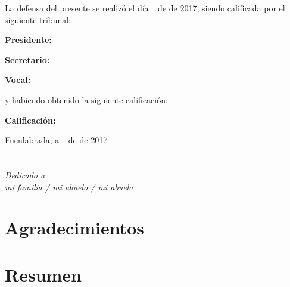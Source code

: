 \vspace{1cm}
La defensa del presente \TFM se realizó el día \qquad$\;\,$ de \qquad\qquad\qquad\qquad \newline de 2017, siendo calificada por el siguiente tribunal:


\vspace{0.5cm}
\textbf{Presidente:}

\vspace{1.2cm}
\textbf{Secretario:}

\vspace{1.2cm}
\textbf{Vocal:}


\vspace{1.2cm}
y habiendo obtenido la siguiente calificación:

\vspace{1cm}
\textbf{Calificación:}


\vspace{1cm}
\begin{flushright}
Fuenlabrada, a \qquad$\;\,$ de \qquad\qquad\qquad\qquad de 2017
\end{flushright}


\chapter*{}
\begin{flushright}
\textit{Dedicado a \\
mi familia / mi abuelo / mi abuela}
\end{flushright}


\chapter*{Agradecimientos}




\chapter*{Resumen}



